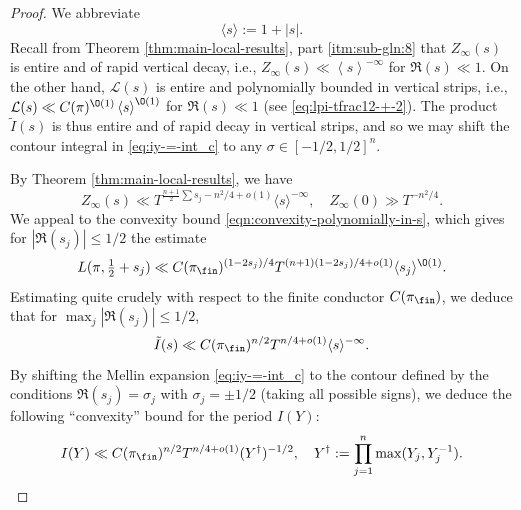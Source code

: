 \begin{proof}
  We abbreviate
  \begin{equation*}
    \langle s \rangle := 1 + |s|.
  \end{equation*}
  Recall from Theorem \ref{thm:main-local-results}, part \eqref{itm:sub-gln:8} that $Z_\infty(s)$ is entire and of rapid vertical decay, i.e., $Z_\infty(s) \ll \left\langle s \right\rangle^{-\infty}$ for $\Re(s) \ll 1$.  On the other hand, $\mathcal{L}(s)$ is entire and polynomially bounded in vertical strips, i.e., $\mathcal{L}(s) \ll C(\pi)^{\O(1)} \left\langle s \right\rangle^{\O(1)}$ for $\Re(s) \ll 1$ (see \eqref{eq:lpi-tfrac12-+-2}).  The product $\tilde{I}(s)$ is thus entire and of rapid decay in vertical strips, and so we may shift the contour integral in \eqref{eq:iy-=-int_c} to any $\sigma \in [-1/2, 1/2]^n$.

  By Theorem \ref{thm:main-local-results}, we have
  \[
    Z_\infty(s) \ll T^{\frac{n+1}{2} \sum s_j - n^2/4 + o(1)} \langle s \rangle^{-\infty},
    \quad
    Z_\infty(0) \gg T^{-{n^2}/{4}}.
  \]
  We appeal to the convexity bound \eqref{eqn:convexity-polynomially-in-s}, which gives for $|\Re(s_j)| \leq 1/2$ the estimate
  \begin{equation*}
    L(\pi, \tfrac{1}{2} +s_j)
    \ll
    C(\pi_{\fin})^{(1 - 2 s_j)/4}
    T^{(n+1)(1 - 2 s_j)/4 + o(1)}
    \langle s_j \rangle^{\O(1)}.
  \end{equation*}
  Estimating quite crudely with respect to the finite conductor $C(\pi_{\fin})$, we deduce that for $\max_j |\Re(s_j)| \leq 1/2$,
  \begin{equation*}
    \tilde{I}(s)
    \ll
    C(\pi_{\fin})^{n/2}
    T^{n/4 + o(1) }
    \langle s \rangle^{-\infty}.
  \end{equation*}
  By shifting the Mellin expansion \eqref{eq:iy-=-int_c} to the contour defined by the conditions $\Re(s_j) = \sigma_j$ with $\sigma_j = \pm 1/2$ (taking all possible signs), we deduce the following ``convexity'' bound for the period $I(Y)$:
  \begin{equation}\label{eq:iy-ll-t}
    I(Y) \ll
    C(\pi_{\fin})^{n/2}
    T^{n/4 + o(1) }
    (Y^\dagger )^{-1/2},
    \quad
    Y^\dagger :=
    \prod_{j=1}^n
    \max(Y_j, Y_j^{-1}).
  \end{equation}


\end{proof}
